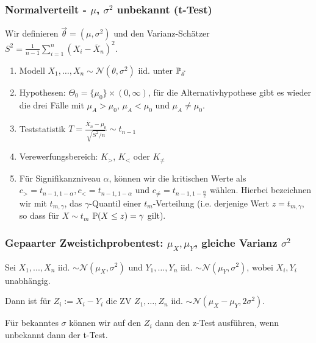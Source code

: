\subsubsection*{\texorpdfstring{Normalverteilt - \(\mu\), \(\sigma^2\) unbekannt (t-Test)}{Normalverteilt - μ, σ² unbekannt (t-Test)}}
Wir definieren \(\vec{\theta} = (\mu, \sigma^2)\) und den Varianz-Schätzer \(S^2 = \frac{1}{n-1}\sum_{i=1}^n (X_i - \overline{X}_n)^2\).
\begin{enumerate}
	\item Modell \(X_1, \ldots, X_n \sim \mathcal{N}(\theta, \sigma^2)\) iid. unter \(\P_{\vec{\theta}}\)
	\item Hypothesen: $\Theta_0 = \{\mu_0\} \times (0, \infty)$, für die Alternativhypothese gibt es wieder die drei Fälle mit $\mu_A > \mu_0$, $\mu_A < \mu_0$ und $\mu_A \neq \mu_0$.
	\item Teststatistik \(T = \frac{\overline{X}_n - \mu_0}{\sqrt{S^2/n}} \sim t_{n-1}\)
	\item Verewerfungsbereich: \(K_{>}\), \(K_{<}\) oder \(K_{\neq}\)
	\item Für Signifikanzniveau $\alpha$, können wir die kritischen Werte als $c_{>} = t_{n-1, 1-\alpha}, c_{<} = t_{n-1, 1- \alpha}$ und $c_{\neq} = t_{n-1, 1- \frac{\alpha}{2}}$ wählen.
	Hierbei bezeichnen wir mit $t_{m, \gamma}$, das $\gamma$-Quantil einer $t_m$-Verteilung (i.e. derjenige Wert $z = t_{m, \gamma}$, so dass für $X \sim t_m$ $\P(X \leq z) = \gamma$ gilt).
\end{enumerate}
\subsubsection*{Gepaarter Zweistichprobentest: $\mu_X, \mu_Y$, gleiche Varianz $\sigma^2$}
Sei $X_1, ..., X_n$ iid. $\sim \mathcal{N}(\mu_X, \sigma^2)$ und $Y_1, \dots, Y_n$ iid. $\sim \mathcal{N}(\mu_Y, \sigma^2)$, wobei $X_i, Y_i$ unabhängig.

Dann ist für $Z_i := X_i - Y_i$ die ZV $Z_1, \dots, Z_n$ iid. $\sim \mathcal{N}(\mu_X -\mu_Y, 2\sigma^2)$. 

Für bekanntes $\sigma$ können wir auf den $Z_i$ dann den z-Test ausführen, wenn unbekannt dann der t-Test.
